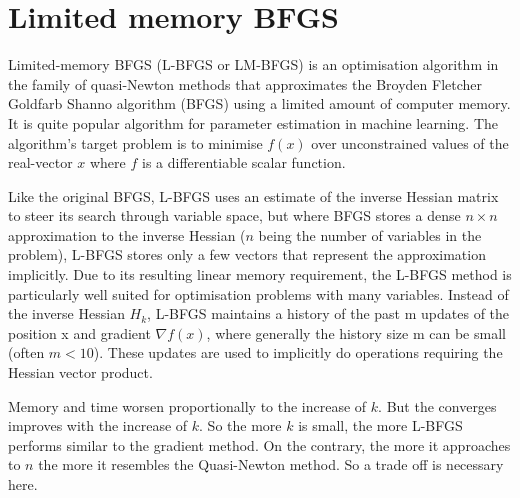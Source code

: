 \section{Limited memory BFGS}
\par Limited-memory BFGS (L-BFGS or LM-BFGS) is an optimisation algorithm in the family of quasi-Newton methods that approximates the Broyden Fletcher Goldfarb Shanno algorithm (BFGS) using a limited amount of computer memory. It is quite popular algorithm for parameter estimation in machine learning. The algorithm's target problem is to minimise $f(x)$ over unconstrained values of the real-vector $x$  where $f$ is a differentiable scalar function.
\par Like the original BFGS, L-BFGS uses an estimate of the inverse Hessian matrix to steer its search through variable space, but where BFGS stores a dense $n \times n$ approximation to the inverse Hessian ($n$ being the number of variables in the problem), L-BFGS stores only a few vectors that represent the approximation implicitly. Due to its resulting linear memory requirement, the L-BFGS method is particularly well suited for optimisation problems with many variables. Instead of the inverse Hessian $H_k$, L-BFGS maintains a history of the past m updates of the position x and gradient $\nabla f(x)$, where generally the history size m can be small (often $m < 10$). These updates are used to implicitly do operations requiring the Hessian vector product.
\par Memory and time worsen proportionally to the increase of $k$. But the converges improves with the increase of $k$. So the more $k$ is small, the more L-BFGS performs similar to the gradient method. On the contrary, the more it approaches to $n$ the more it resembles the Quasi-Newton method. So a trade off is necessary here.
%
%
%
